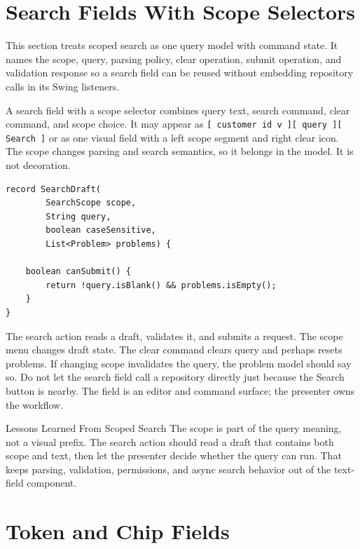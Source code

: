\section{Search Fields With Scope Selectors}

\begin{roadmapbox}
This section treats scoped search as one query model with command state. It
names the scope, query, parsing policy, clear operation, submit operation, and
validation response so a search field can be reused without embedding repository
calls in its Swing listeners.
\end{roadmapbox}

A search field with a scope selector combines query text, search command, clear command,
and scope choice. It may appear as \texttt{[ customer id v ][ query ][ Search ]} or as
one visual field with a left scope segment and right clear icon. The scope changes
parsing and search semantics, so it belongs in the model. It is not decoration.

\begin{lstlisting}[caption={Scoped search state keeps query and scope together.}]
record SearchDraft(
        SearchScope scope,
        String query,
        boolean caseSensitive,
        List<Problem> problems) {

    boolean canSubmit() {
        return !query.isBlank() && problems.isEmpty();
    }
}
\end{lstlisting}

The search action reads a draft, validates it, and submits a request. The scope menu
changes draft state. The clear command clears query and perhaps resets problems. If
changing scope invalidates the query, the problem model should say so. Do not let the
search field call a repository directly just because the Search button is nearby. The
field is an editor and command surface; the presenter owns the workflow.

\begin{principlebox}{Lessons Learned From Scoped Search}
The scope is part of the query meaning, not a visual prefix. The search action
should read a draft that contains both scope and text, then let the presenter
decide whether the query can run. That keeps parsing, validation, permissions,
and async search behavior out of the text-field component.
\end{principlebox}

\section{Token and Chip Fields}

